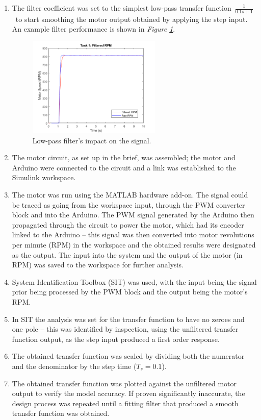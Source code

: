 \documentclass[11pt, onecolumn]{article}
\begin{document}
\begin{enumerate}
    \item The filter coefficient was set to the simplest low-pass transfer function $\frac{1}{0.1s+1}$ to start smoothing the motor output obtained by applying the step input. An example filter performance is shown in \textit{Figure \ref{fig:q1-filter}}.
          \begin{figure}[h!]
              \centering
              \includegraphics[width=0.6\textwidth]{q1-filter.png}
              \caption{Low-pass filter's impact on the signal.}
              \label{fig:q1-filter}
          \end{figure}
    \item The motor circuit, as set up in the brief, was assembled; the motor and Arduino were connected to the circuit and a link was established to the Simulink workspace.
    \item The motor was run using the MATLAB hardware add-on. The signal could be traced as going from the workspace input, through the PWM converter block and into the Arduino. The PWM signal generated by the Arduino then propagated through the circuit to power the motor, which had its encoder linked to the Arduino – this signal was then converted into motor revolutions per minute (RPM) in the workspace and the obtained results were designated as the output. The input into the system and the output of the motor (in RPM) was saved to the workspace for further analysis.
    \item System Identification Toolbox (SIT) was used, with the input being the signal prior being processed by the PWM block and the output being the motor's RPM.
    \item In SIT the analysis was set for the transfer function to have no zeroes and one pole – this was identified by inspection, using the unfiltered transfer function output, as the step input produced a first order response.
    \item The obtained transfer function was scaled by dividing both the numerator and the denominator by the step time ($T_s = 0.1$).
    \item The obtained transfer function was plotted against the unfiltered motor output to verify the model accuracy. If proven significantly inaccurate, the design process was repeated until a fitting filter that produced a smooth transfer function was obtained.
\end{enumerate}
\end{document}
